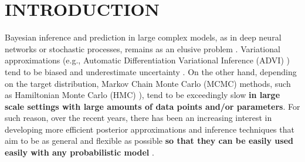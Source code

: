 
\section{INTRODUCTION}
Bayesian inference and prediction in large complex models, as in 
deep neural networks or stochastic processes, remains as an elusive problem \cite{blei2017variational,insua2012bayesian,alquier2020approximate}.
%
%
%
Variational approximations (e.g., Automatic Differentiation Variational Inference (ADVI) \cite{kucukelbir2017automatic}) tend to be biased and 
underestimate uncertainty \cite{riquelme2018failure}. 
On the other hand, depending on the target distribution,
Markov Chain Monte Carlo (MCMC) \cite{andrieu2010particle} 
methods, such 
as Hamiltonian Monte Carlo (HMC) \cite{neal2011mcmc}),   
tend to be exceedingly slow  \cite{van2018simple} {\bf in large scale settings with large amounts of data points and/or  parameters}. For such reason, over the recent years, there has been an increasing interest in developing more efficient posterior approximations \cite{nalisnick2016approximate,salimans2015markov,tran2015variational} and inference techniques that aim to be as general and flexible as possible {\bf so that they can be easily used easily with any probabilistic model} \cite{wood2014new, ge2018t}.


